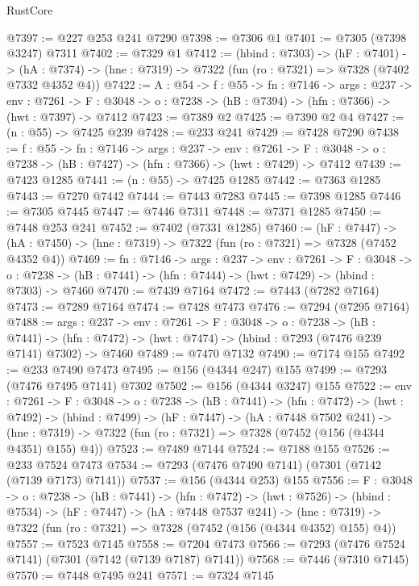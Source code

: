 \begin{lexlean}{RustCore}
\begin{coremodule}
@7397 := @227 @253 @241 @7290
@7398 := @7306 @1
@7401 := @7305 (@7398 @3247) @7311
@7402 := @7329 @1
@7412 := (hbind : @7303) ->
  (hF : @7401) ->
  (hA : @7374) -> (hne : @7319) -> @7322 (fun (ro : @7321) => @7328 (@7402 @7332 @4352 @4))
@7422 := {A : @54} ->
  {f : @55} ->
  {fn : @7146} ->
  {args : @237} ->
  {env : @7261} ->
  {F : @3048} -> {o : @7238} -> (hB : @7394) -> (hfn : @7366) -> (hwt : @7397) -> @7412
@7423 := @7389 @2
@7425 := @7390 @2 @4
@7427 := (n : @55) -> @7425 @239
@7428 := @233 @241
@7429 := @7428 @7290
@7438 := {f : @55} ->
  {fn : @7146} ->
  {args : @237} ->
  {env : @7261} ->
  {F : @3048} -> {o : @7238} -> (hB : @7427) -> (hfn : @7366) -> (hwt : @7429) -> @7412
@7439 := @7423 @1285
@7441 := (n : @55) -> @7425 @1285
@7442 := @7363 @1285
@7443 := @7270 @7442
@7444 := @7443 @7283
@7445 := @7398 @1285
@7446 := @7305 @7445
@7447 := @7446 @7311
@7448 := @7371 @1285
@7450 := @7448 @253 @241
@7452 := @7402 (@7331 @1285)
@7460 := (hF : @7447) ->
  (hA : @7450) -> (hne : @7319) -> @7322 (fun (ro : @7321) => @7328 (@7452 @4352 @4))
@7469 := {fn : @7146} ->
  {args : @237} ->
  {env : @7261} ->
  {F : @3048} ->
  {o : @7238} -> (hB : @7441) -> (hfn : @7444) -> (hwt : @7429) -> (hbind : @7303) -> @7460
@7470 := @7439 @7164
@7472 := @7443 (@7282 @7164)
@7473 := @7289 @7164
@7474 := @7428 @7473
@7476 := @7294 (@7295 @7164)
@7488 := {args : @237} ->
  {env : @7261} ->
  {F : @3048} ->
  {o : @7238} ->
  (hB : @7441) ->
  (hfn : @7472) -> (hwt : @7474) -> (hbind : @7293 (@7476 @239 @7141) @7302) -> @7460
@7489 := @7470 @7132
@7490 := @7174 @155
@7492 := @233 @7490 @7473
@7495 := @156 (@4344 @247) @155
@7499 := @7293 (@7476 @7495 @7141) @7302
@7502 := @156 (@4344 @3247) @155
@7522 := {env : @7261} ->
  {F : @3048} ->
  {o : @7238} ->
  (hB : @7441) ->
  (hfn : @7472) ->
  (hwt : @7492) ->
  (hbind : @7499) ->
  (hF : @7447) ->
  (hA : @7448 @7502 @241) ->
  (hne : @7319) -> @7322 (fun (ro : @7321) => @7328 (@7452 (@156 (@4344 @4351) @155) @4))
@7523 := @7489 @7144
@7524 := @7188 @155
@7526 := @233 @7524 @7473
@7534 := @7293 (@7476 @7490 @7141) (@7301 (@7142 (@7139 @7173) @7141))
@7537 := @156 (@4344 @253) @155
@7556 := {F : @3048} ->
  {o : @7238} ->
  (hB : @7441) ->
  (hfn : @7472) ->
  (hwt : @7526) ->
  (hbind : @7534) ->
  (hF : @7447) ->
  (hA : @7448 @7537 @241) ->
  (hne : @7319) -> @7322 (fun (ro : @7321) => @7328 (@7452 (@156 (@4344 @4352) @155) @4))
@7557 := @7523 @7145
@7558 := @7204 @7473
@7566 := @7293 (@7476 @7524 @7141) (@7301 (@7142 (@7139 @7187) @7141))
@7568 := @7446 (@7310 @7145)
@7570 := @7448 @7495 @241
@7571 := @7324 @7145

\end{coremodule}
\end{lexlean}
